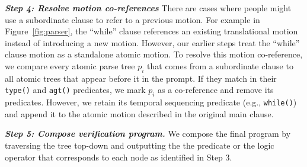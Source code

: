 \vspace{0.5em}
\noindent
{\bf \em Step 4: Resolve motion co-references}
There are cases where people might use a subordinate clause to refer
to a previous motion.  For example in Figure~\ref{fig:parser}, the
``while'' clause references an existing translational motion instead
of introducing a new motion.
%
However, our earlier steps treat the ``while'' clause motion as
a standalone atomic motion.
%
To resolve this motion co-reference, we compare every atomic parse tree
$p_{i}$ that comes from a subordinate clause to all atomic trees that
appear before it in the prompt.
%
If they match in their {\tt type()} and {\tt agt()}
predicates, we mark $p_{i}$ as a co-reference and remove its
predicates. However, we retain its temporal sequencing predicate
(e.g., \texttt{while()}) and append it to the atomic motion described in the
original main clause.


\vspace{0.5em}
\noindent
{\bf \em Step 5: Compose \dslname{} verification program.}
We compose the final \dslname{} program by traversing the tree
top-down and outputting the the predicate or the logic operator that
corresponds to each node as identified in Step 3.


